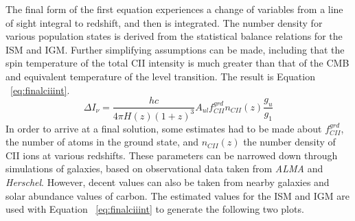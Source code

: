 \documentclass[manuscript]{aastex}
\begin{document}
The final form of the first equation experiences a change of variables from a line of sight integral to redshift, and then is integrated. The number density for various population states is derived from the statistical balance relations for the ISM and IGM. 
Further simplifying assumptions can be made, including that the spin temperature of the total CII intensity is much greater than that of the CMB and equivalent temperature of the level transition. The result is Equation ~\ref{eq:finalciiint}.
\begin{equation}\label{eq:finalciiint}
\Delta I_{\nu} = \frac{h c}{4 \pi H(z) (1+z)^{3}} A_{ul} f_{CII}^{grd} n_{CII}(z) \frac{g_{u}}{g_{1}} 
\end{equation}
In order to arrive at a final solution, some estimates had to be made about  $f_{CII}^{grd}$, the number of atoms in the ground state, and $n_{CII}(z)$ the number density of CII ions at various redshifts. 
These parameters can be narrowed down through simulations of galaxies, based on observational data taken from \textit{ALMA} and \textit{Herschel}. However, decent values can also be taken from nearby galaxies and solar abundance values of carbon. The estimated values for the ISM and IGM are used with Equation ~\ref{eq:finalciiint} to generate the following two plots.
\end{document}
